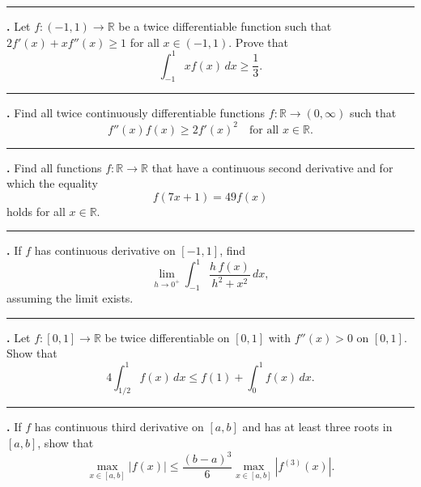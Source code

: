 \documentclass[11pt]{article}
\newcounter{probnum}
\newenvironment{problembox}{\par\noindent\rule{\linewidth}{0.5pt}\vspace{5pt}\par}{\vspace{2pt}}
\begin{document}
\begin{problembox}
\textbf{\theprobnum.} Let $f : (-1,1) \to \mathbb{R}$ be a twice differentiable function such that $2f'(x) + xf''(x) \ge 1$ for all $x \in (-1,1)$. Prove that
\[
\int_{-1}^1 x f(x)\,dx \ge \frac{1}{3}.
\]
\end{problembox}

\begin{problembox}
\textbf{\theprobnum.} Find all twice continuously differentiable functions $f : \mathbb{R} \to (0,\infty)$ such that
\[
f''(x) f(x) \ge 2f'(x)^2 \quad \text{for all } x \in \mathbb{R}.
\]
\end{problembox}

\begin{problembox}
\textbf{\theprobnum.} Find all functions $f : \mathbb{R} \to \mathbb{R}$ that have a continuous second derivative and for which the equality
\[
f(7x+1) = 49 f(x)
\]
holds for all $x \in \mathbb{R}$.
\end{problembox}

\begin{problembox}
\textbf{\theprobnum.}  If $f$ has continuous derivative on $[-1,1]$, find
\[
\lim_{h \to 0^+} \int_{-1}^{1} \frac{h\,f(x)}{h^2+x^2}\,dx,
\]
assuming the limit exists.
\end{problembox}

\begin{problembox}
\textbf{\theprobnum.} Let $f : [0,1] \to \mathbb{R}$ be twice differentiable on $[0,1]$ with $f''(x) > 0$ on $[0,1]$. Show that
\[
4 \int_{1/2}^{1} f(x)\,dx \le f(1) + \int_0^1 f(x)\,dx.
\]
\end{problembox}

\begin{problembox}
\textbf{\theprobnum.} If $f$ has continuous third derivative on $[a,b]$ and has at least three roots in $[a,b]$, show that
\[
\max_{x \in [a,b]} |f(x)| \le \frac{(b-a)^3}{6} \max_{x \in [a,b]} |f^{(3)}(x)|.
\]
\end{problembox}
\end{document}
